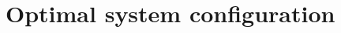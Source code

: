 \documentclass[11pt,a4paper]{report}
\begin{document}

\section{Optimal system configuration}
\label{sec:results_optimal}

\end{document}
